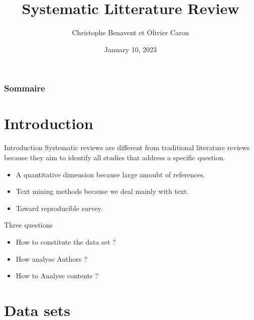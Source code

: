 \documentclass[
  9pt,
  ignorenonframetext,
  aspectratio=54,
]{beamer}
\title{Systematic Litterature Review}
\author{Christophe Benavent et Olivier Caron}
\date{January 10, 2023}
\institute{Université Dauphine-PSL - DRM - Acss}
\renewcommand*\contentsname{Table of contents}
\newcommand\contentsname{Table of contents}
\begin{document}
\frame{\titlepage}
\ifdefined\Shaded\renewenvironment{Shaded}{\begin{tcolorbox}[boxrule=0pt, frame hidden, interior hidden, sharp corners, enhanced, breakable, borderline west={3pt}{0pt}{shadecolor}]}{\end{tcolorbox}}\fi

\renewcommand*\contentsname{Sommaire}
\begin{frame}[allowframebreaks]
  \frametitle{Sommaire}
  \tableofcontents[hideallsubsections]
\end{frame}
\hypertarget{introduction}{%
\section{Introduction}\label{introduction}}

\begin{frame}{Introduction}
Systematic reviews are different from traditional literature reviews
because they aim to identify all studies that address a specific
question.

\begin{itemize}
\item
  A quantitative dimension because large amoubt of references.
\item
  Text mining methods because we deal mainly with text.
\item
  Toward reproducible survey.
\end{itemize}

Three questions

\begin{itemize}
\item
  How to constitute the data set ?
\item
  How analyse Authors ?
\item
  How to Analyse contents ?
\end{itemize}
\end{frame}

\hypertarget{data-sets}{%
\section{Data sets}\label{data-sets}}
\end{document}
